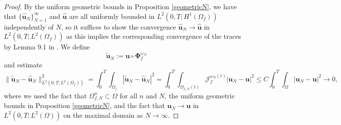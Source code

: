 \documentclass[11pt]{article}
\newcommand{\bd}{\boldsymbol}
\theoremstyle{definition}
\begin{document}
\begin{proof}
By the uniform geometric bounds in Proposition \ref{geometricN}, we have that $\{\hat{\bd{u}}_{N}\}_{N = 1}^{\infty}$ and $\hat{\bd{u}}$ are all uniformly bounded in $L^{2}(0, T; H^{1}(\Omega_{f}))$ independently of $N$, so it suffices to show the convergence $\hat{\bd{u}}_{N} \to \hat{\bd{u}}$ in $L^{2}(0, T; L^{2}(\Omega_{f}))$ as this implies the corresponding convergence of the traces by Lemma 9.1 in \cite{FPSIJMPA}. We define
\begin{equation*}
\tilde{\bd{u}}_{N} := \bd{u} \circ \bd{\Phi}^{\omega_{N}}_{f}
\end{equation*}
and estimate
\begin{equation*}
\|\tilde{\bd{u}}_{N} - \hat{\bd{u}}_{N}\|_{L^{2}(0, T; L^{2}(\Omega_{f}))}^{2} = \int_{0}^{T} \int_{\Omega_{f}} |\tilde{\bd{u}}_{N} - \hat{\bd{u}}_{N}|^{2} = \int_{0}^{T} \int_{\Omega_{f, N}(t)} \mathcal{J}^{\omega_{N}(t)}_{f} |\bd{u}_{N} - \bd{u}|^{2} \le C\int_{0}^{T} \int_{\Omega} |\bd{u}_{N} - \bd{u}|^{2} \to 0,
\end{equation*}
where we used the fact that $\Omega^{n}_{f, N} \subset \Omega$ for all $n$ and $N$, the uniform geometric bounds in Proposition \ref{geometricN}, and the fact that $\bd{u}_{N} \to \bd{u}$ in $L^{2}(0, T; L^{2}(\Omega))$ on the maximal domain as $N \to \infty$. 


\end{proof}
\end{document}
